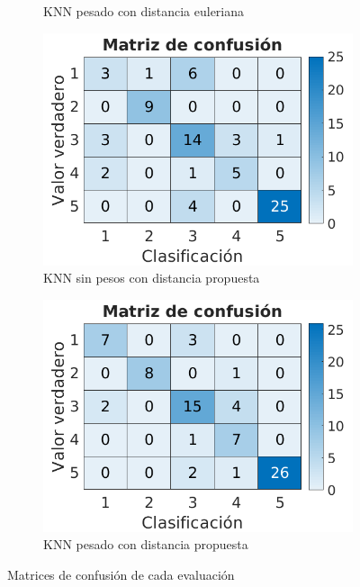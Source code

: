 \documentclass[a4paper]{article}
\begin{document}
\begin{figure}[h]
\begin{subfigure}{.4\textwidth}
    \caption{KNN pesado con distancia euleriana}
    \label{sent-cm:sfig2}
  \end{subfigure}
  \begin{subfigure}{.4\textwidth}
    \centering
    \includegraphics[width=\linewidth]{img/cm-weul.png}
    \caption{KNN sin pesos con distancia propuesta}
    \label{sent-cm:sfig3}
  \end{subfigure}
  \begin{subfigure}{.4\textwidth}
    \centering
    \includegraphics[width=\linewidth]{img/cm-wcust.png}
    \caption{KNN pesado con distancia propuesta}
    \label{sent-cm:sfig4}
  \end{subfigure}
  \caption{Matrices de confusión de cada evaluación}
  \label{sent-cm:fig}
\end{figure}
\end{document}
